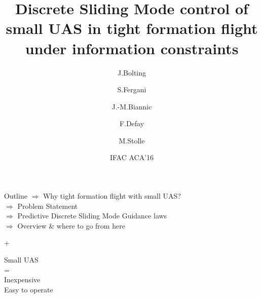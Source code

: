 \documentclass[]{beamer}
\begin{document}
\usebackgroundtemplate{
}

\title{Discrete Sliding Mode control of small UAS in tight formation flight under information constraints}

\author{J.Bolting \and S.Fergani \and J.-M.Biannic \and F.Defay \and M.Stolle}
  
 
\date{IFAC ACA'16}




\usebackgroundtemplate{}

\begin{frame}{Outline}
  $\Rightarrow$ Why tight formation flight with small UAS?\\
  \vspace{1em}
  $\Rightarrow$ Problem Statement\\
  \vspace{1em}  
  $\Rightarrow$ Predictive Discrete Sliding Mode Guidance laws \\
  \vspace{1em}  
  $\Rightarrow$ Overview \& where to go from here\\
\end{frame}

\begin{frame}{+}
\vspace{7em}
\centering
	\begin{tcolorbox}[width=.8\textwidth,colback={gray!10!}]  
	\centering
	\Large
	Small UAS \\
	= \\
	Inexpensive \\
	Easy to operate
	\end{tcolorbox}  
	
\end{frame}
\end{document}
